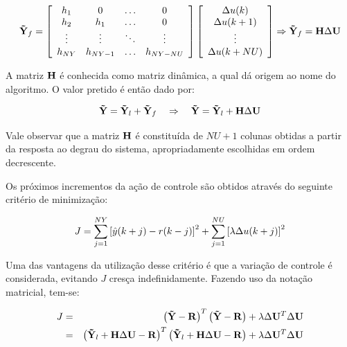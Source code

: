 \begin{equation}\label{eq:resp_forc_mat}
\mathbf{\tilde{Y}}_f = 
\left[
    \begin{array}{cccc}
        h_1 & 0 & \ldots & 0\\
        h_2 & h_1 & \ldots & 0\\
        \vdots & \vdots & \ddots & \vdots\\
        h_{NY} & h_{NY-1} & \ldots & h_{NY-NU}
    \end{array}
\right]
\left[
    \begin{array}{c}
        \Delta u(k)\\
        \Delta u(k+1)\\
        \vdots\\
        \Delta u(k+NU)\\
    \end{array}
\right]
\Rightarrow \mathbf{\tilde{Y}}_f = \mathbf{H}\Delta\mathbf{U}
\end{equation}

A matriz $\mathbf{H}$ é conhecida como matriz dinâmica, a qual dá origem ao nome do
algoritmo. O valor pretido é então dado por:

\begin{equation}\label{eq:y_pred_mat}
\mathbf{\tilde{Y}} = \mathbf{\tilde{Y}}_l + \mathbf{\tilde{Y}}_f\quad\Rightarrow\quad
\mathbf{\tilde{Y}} = \mathbf{\tilde{Y}}_l + \mathbf{H}\Delta\mathbf{U}
\end{equation}

Vale observar que a matriz $\mathbf{H}$ é constituída de $NU+1$ colunas obtidas a
partir da resposta ao degrau do sistema, apropriadamente escolhidas em ordem
decrescente.

Os próximos incrementos da ação de controle são obtidos através do seguinte
critério de minimização:

\begin{equation*}
J = \sum_{j=1}^{NY}\left[\hat{y}(k+j)-r(k-j)\right]^2 + 
    \sum_{j=1}^{NU}\left[\lambda\Delta u(k+j)\right]^2
\end{equation*}

Uma das vantagens da utilização desse critério é que a variação de controle é
considerada, evitando $J$ cresça indefinidamente. Fazendo uso da notação
matricial, tem-se:

\begin{eqnarray}
J & = & \left(\mathbf{\tilde{Y}}-\mathbf{R}\right)^T\left(\mathbf{\tilde{Y}}-\mathbf{R}\right) + 
        \lambda\Delta\mathbf{U}^T\Delta\mathbf{U}\nonumber\\
& = & \left(\mathbf{\tilde{Y}}_l+\mathbf{H}\Delta\mathbf{U}-\mathbf{R}\right)^T
      \left(\mathbf{\tilde{Y}}_l+\mathbf{H}\Delta\mathbf{U}-\mathbf{R}\right) + 
      \lambda\Delta\mathbf{U}^T\Delta\mathbf{U}\nonumber
\end{eqnarray}

